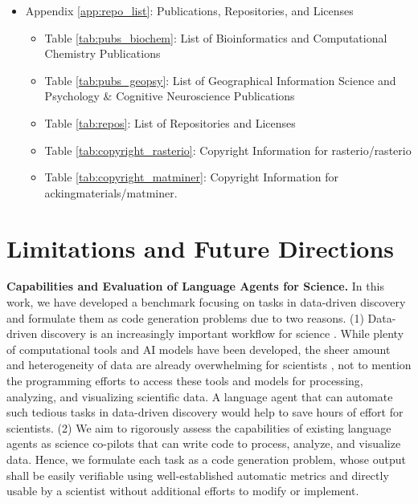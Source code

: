 \begin{itemize}
    \item Appendix \ref{app:repo_list}: Publications, Repositories, and Licenses
    \begin{itemize}
        \item Table \ref{tab:pubs_biochem}: List of Bioinformatics and Computational Chemistry Publications
        \item Table \ref{tab:pubs_geopsy}: List of Geographical Information Science and Psychology \& Cognitive Neuroscience Publications
        \item Table \ref{tab:repos}: List of Repositories and Licenses
        \item Table \ref{tab:copyright_rasterio}: Copyright Information for rasterio/rasterio
        \item Table \ref{tab:copyright_matminer}: Copyright Information for ackingmaterials/matminer.
    \end{itemize}
\end{itemize}

\newpage
\setcounter{table}{0}
\renewcommand\thetable{\Alph{section}.\arabic{table}}
\setcounter{figure}{0}
\renewcommand\thefigure{\Alph{section}.\arabic{figure}}

\section{Limitations and Future Directions}
\label{app:limitation}

%
\textbf{Capabilities and Evaluation of Language Agents for Science.}
In this work, we have developed a benchmark focusing on tasks in data-driven discovery and formulate them as code generation problems due to two reasons.
(1) Data-driven discovery is an increasingly important workflow for science \citep{hey2009fourthparadigm}.
While plenty of computational tools \citep{ds_survey} and AI models \citep{ai4science_bengio} have been developed, the sheer amount and heterogeneity of data are already overwhelming for scientists \citep{doi:10.1126/science.1170411}, not to mention the programming efforts to access these tools and models for processing, analyzing, and visualizing scientific data.
A language agent that can automate such tedious tasks in data-driven discovery would help to save hours of effort for scientists. 
(2) We aim to rigorously assess the capabilities of existing language agents as science co-pilots that can write code to process, analyze, and visualize data. 
Hence, we formulate each task as a code generation problem, whose output shall be easily verifiable using well-established automatic metrics and directly usable by a scientist without additional efforts to modify or implement.

